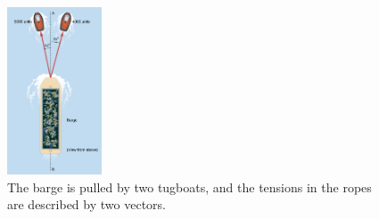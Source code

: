 \documentclass{article}
\begin{document}
\begin{figure}[ht]
\centering
\includegraphics[width=0.25\textwidth]{figures/boat.jpeg}
\caption{\label{fig:1} The barge is pulled by two tugboats, and the tensions in the ropes are described by two vectors.}
\end{figure}
\end{document}
